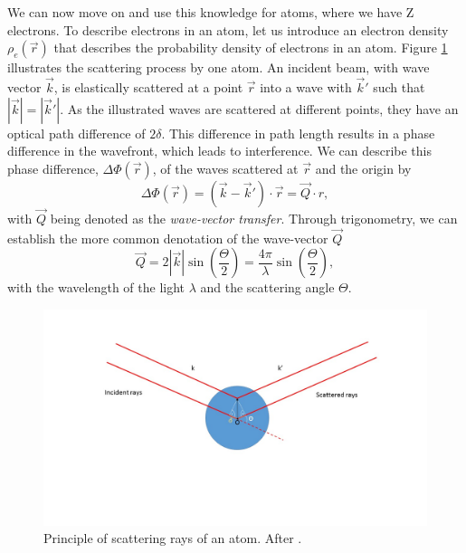 We can now move on and use this knowledge for atoms, where we have Z electrons. To describe electrons in an atom, let us introduce an electron density $\rho_{e}\left(\vec{r}\right)$ that describes the probability density of electrons in an atom. Figure \ref{fig:X-ray-scattering} illustrates the scattering process by one atom. An incident beam, with wave vector $\vec{k}$, is elastically scattered at a point $\vec{r}$ into a wave with $\vec{k}'$ such that $\left|\vec{k}\right|=\left|\vec{k}'\right|$. As the illustrated waves are scattered at different points, they have an optical path difference of $2 \delta$. This difference in path length results in a phase difference in the wavefront, which leads to interference. We can describe this phase difference, $\Delta \Phi\left(\vec{r}\right)$, of the waves scattered at $\vec{r}$ and the origin by
\begin{equation}
\Delta \Phi\left(\vec{r}\right) = \left(\vec{k}-\vec{k}'\right)\cdot \vec{r} = \vec{Q} \cdot r,
\label{eq:phase-difference}
\end{equation}
with $\vec{Q}$ being denoted as the \textit{wave-vector transfer}. Through trigonometry, we can establish the more common denotation of the wave-vector $\vec{Q}$
\begin{equation}
\vec{Q}=2 \left|\vec{k}\right| \sin\left(\frac{\Theta}{2}\right)=\frac{4 \pi}{\lambda}\sin\left(\frac{\Theta}{2}\right),
\label{eq:Q-scattering-angle}
\end{equation}
with the wavelength of the light $\lambda$ and the scattering angle $\Theta$.\\[1\baselineskip]
\begin{figure}
	\centering
		\includegraphics[width=1.00\textwidth]{images/X-ray-scattering.jpg}
	\caption[Principle of scattering rays of an atom.]{Principle of scattering rays of an atom. After \cite{Als-Nielson-2011-JWS,Guinier-1955-JWS}.}
	\label{fig:X-ray-scattering}
\end{figure}
